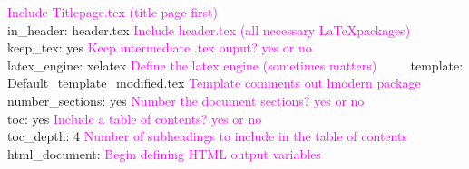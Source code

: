 \documentclass[12pt,]{article}
\begin{document}
\textcolor{magenta}{Include Titlepage.tex (title page first)}\\
\hspace*{0.333em}\hspace*{0.333em}\hspace*{0.333em}\hspace*{0.333em}\hspace*{0.333em}\hspace*{0.333em}\hspace*{0.333em}
in\_header: header.tex
\textcolor{magenta}{Include header.tex (all necessary \LaTeX packages)}\\
\hspace*{0.333em}\hspace*{0.333em}\hspace*{0.333em}\hspace*{0.333em}
keep\_tex: yes
\textcolor{magenta}{Keep intermediate .tex ouput? yes or no}\\
\hspace*{0.333em}\hspace*{0.333em}\hspace*{0.333em}\hspace*{0.333em}
latex\_engine: xelatex
\textcolor{magenta}{Define the latex engine (sometimes matters)} ~~~~
template: Default\_template\_modified.tex
\textcolor{magenta}{Template comments out lmodern package} ~~~~
number\_sections: yes
\textcolor{magenta}{Number the document sections? yes or no}\\
\hspace*{0.333em}\hspace*{0.333em}\hspace*{0.333em}\hspace*{0.333em}
toc: yes \textcolor{magenta}{Include a table of contents? yes or no}\\
\hspace*{0.333em}\hspace*{0.333em}\hspace*{0.333em}\hspace*{0.333em}
toc\_depth: 4
\textcolor{magenta}{Number of subheadings to include in the table of contents}\\
\hspace*{0.333em}\hspace*{0.333em} html\_document:
\textcolor{magenta}{Begin defining HTML output variables}\\
\hspace*{0.333em}\hspace*{0.333em}\hspace*{0.333em}\hspace*{0.333em}
\end{document}
